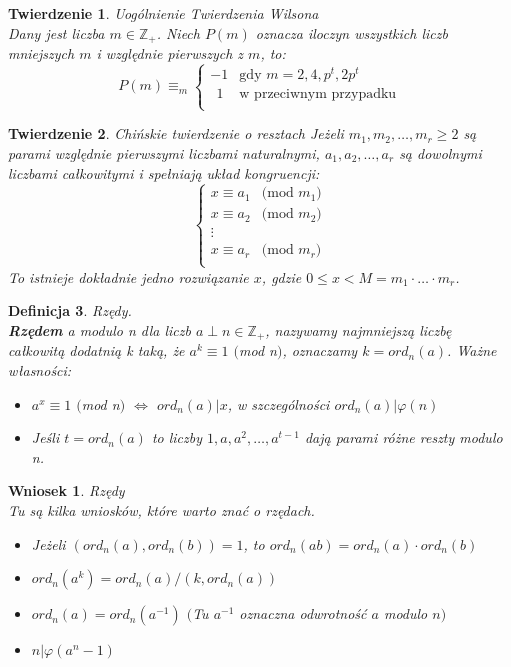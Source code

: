 \documentclass[10pt,a4paper]{article}
\newtheorem{theorem}{Twierdzenie}[section]
\newtheorem{corollary}{Wniosek}[theorem]
\newtheorem{defi}[theorem]{Definicja}
\newcommand{\Z}{\mathbb{Z}}
\begin{document}
\begin{theorem}{Uogólnienie Twierdzenia Wilsona}
	\\
	\color{black}
	Dany jest liczba $m \in \Z_{+}$. Niech $P(m)$ oznacza iloczyn wszystkich liczb mniejszych $m$ i względnie pierwszych z $m$, to:
	$$
	P(m) \equiv_m
	\left\{ \begin{array}{ll}
	-1 & \textrm{gdy } m= 2, 4, p^t, 2p^t \\
	~~ 1 & \textrm{w przeciwnym przypadku}\\
	\end{array} \right.
	$$
\end{theorem}
\begin{theorem}{Chińskie twierdzenie o resztach}
\color{black}
Jeżeli $m_1,m_2,\ldots,m_r \geq 2$ są parami względnie pierwszymi liczbami naturalnymi, $a_1,a_2,\ldots,a_r$ są dowolnymi liczbami całkowitymi i spełniają układ kongruencji:
	$$
	\left\{ \begin{array}{ll}
	x \equiv a_1 & \textrm{$($mod {$m_1$}$)$}\\
	x \equiv a_2 & \textrm{$($mod {$m_2$}$)$}\\
	\vdots\\
	x \equiv a_r & \textrm{$($mod {$m_r$}$)$}\\
	\end{array} \right.
	$$
	To istnieje dokładnie jedno rozwiązanie $x$, gdzie $0 \leq x < M=m_1\cdot\ldots\cdot m_r$.
\end{theorem}
\begin{defi}{Rzędy.}
\color{black}
\\
\textbf{Rzędem} a modulo n dla liczb $a \perp n \in \Z_{+}$, nazywamy najmniejszą liczbę całkowitą dodatnią k taką, że $a^k \equiv 1$ $($mod n$)$, oznaczamy $k=ord_n(a)$.
Ważne własności:
\begin{itemize}
	\item $a^x \equiv 1$ $($mod n$)$ $\Longleftrightarrow$ $ord_n(a)|x$, w szczególności $ord_n(a)|\varphi(n)$
	\item Jeśli $t=ord_n(a)$ to liczby $1,a,a^2,\ldots,a^{t-1}$ dają parami różne reszty modulo n.
\end{itemize}
\end{defi}
\begin{corollary}{Rzędy}
	\\
	\color{black}
	Tu są kilka wniosków, które warto znać o rzędach.
	\begin{itemize}
		\item 
		Jeżeli $(ord_n(a),ord_n(b))=1$, to $ord_n(ab)=ord_n(a)\cdot ord_n(b)$
		\item
		$ord_n(a^k)={ord_n(a)}/{(k,ord_n(a))}$
		\item
		$ord_n(a)=ord_n(a^{-1})$ $($Tu $a^{-1}$ oznaczna odwrotność $a$ modulo $n$$)$
		\item
		$n|\varphi(a^n-1)$
	\end{itemize}
\end{corollary}
\end{document}
